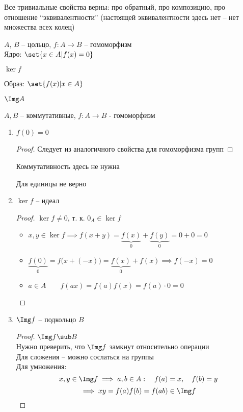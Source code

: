 Все тривиальные свойства верны: про обратный, про композицию, про отношение ``эквивалентности'' (настоящей эквивалентности здесь нет -- нет множества всех колец)

\begin{definition}
	$ A $, $ B $ -- цольцо, $ f : A \to B $ -- гомоморфизм \\
	Ядро: $ \set{x \in A | f(x) = 0} $
	\begin{notation}
		$ \ker f $
	\end{notation}
	Образ: $ \set{f(x) | x \in A} $
	\begin{notation}
		$ \Img A $
	\end{notation}
\end{definition}

\begin{properties}
	$ A, B $ -- коммутативные, $ f : A \to B $ - гомоморфизм
	\begin{enumerate}
		\item $ f(0) = 0 $
		\begin{proof}
			Следует из аналогичного свойства для гомоморфизма групп
		\end{proof}
		\begin{remark}
			Коммутативность здесь не нужна
		\end{remark}
		\begin{remark}
			Для единицы не верно
		\end{remark}
		\item $ \ker f $ -- идеал
		\begin{proof}
			$ \ker f \ne 0 $, т. к. $ 0_A \in \ker f $
			\begin{itemize}
				\item $ x, y \in \ker f \implies f(x + y) = \underbrace{f(x)}_0 + \underbrace{f(y)}_0 = 0 + 0 = 0 $
				\item $ \underbrace{f(0)}_0 = f \big( x + (-x) \big) = \underbrace{f(x)}_0 + f(x) \implies f(-x) = 0 $
				\item $ a \in A \qquad f(ax) = f(a)f(x) = f(a) \cdot 0 = 0 $
			\end{itemize}
		\end{proof}
		\item $ \Img f $ -- подкольцо $ B $
		\begin{proof}
			$ \Img f \sub B $ \\
			Нужно преверить, что $ \Img f $ замкнут относительно операции \\
			Для сложения -- можно сослаться на группы \\
			Для умножения:
			$$ x, y \in \Img f \implies a, b \in A : \quad f(a) = x, \quad f(b) = y $$
			$$ \implies xy = f(a)f(b) = f(ab) \in \Img f $$
		\end{proof}
	\end{enumerate}
\end{properties}

